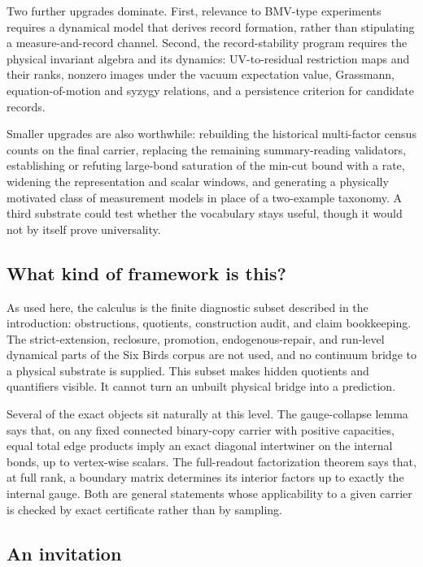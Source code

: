 \documentclass[11pt]{article}
\theoremstyle{definition}
\begin{document}
Two further upgrades dominate. First, relevance to BMV-type experiments requires a dynamical model that derives record
formation, rather than stipulating a measure-and-record channel. Second, the record-stability program requires the
physical invariant algebra and its dynamics: UV-to-residual restriction maps and their ranks, nonzero images under the
vacuum expectation value, Grassmann, equation-of-motion and syzygy relations, and a persistence criterion for candidate
records.

Smaller upgrades are also worthwhile: rebuilding the historical multi-factor census counts on the final carrier,
replacing the remaining summary-reading validators, establishing or refuting large-bond saturation of the min-cut bound
with a rate, widening the representation and scalar windows, and generating a physically motivated class of
measurement models in place of a two-example taxonomy. A third substrate could test whether the vocabulary stays
useful, though it would not by itself prove universality.

\subsection{What kind of framework is this?}\label{what-kind-of-theory-is-this}

As used here, the calculus is the finite diagnostic subset described in the introduction: obstructions, quotients,
construction audit, and claim bookkeeping. The strict-extension, reclosure, promotion, endogenous-repair, and run-level
dynamical parts of the Six Birds corpus are not used, and no continuum bridge to a physical substrate is supplied. This
subset makes hidden quotients and quantifiers visible. It cannot turn an unbuilt physical bridge into a prediction.

Several of the exact objects sit naturally at this level. The gauge-collapse lemma says that, on any fixed connected
binary-copy carrier with positive capacities, equal total edge products imply an exact diagonal intertwiner on the
internal bonds, up to vertex-wise scalars. The full-readout factorization theorem says that, at full rank, a boundary
matrix determines its interior factors up to exactly the internal gauge. Both are general statements whose
applicability to a given carrier is checked by exact certificate rather than by sampling.

\subsection{An invitation}\label{an-invitation}
\end{document}
